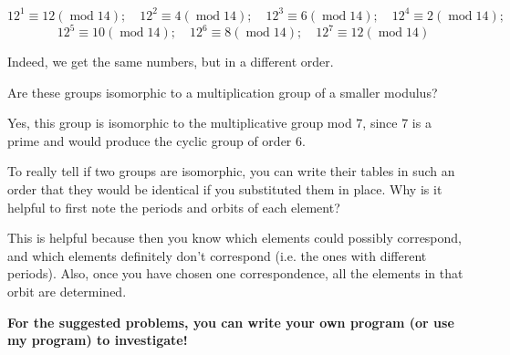 \documentclass[../gatm_answers.tex]{subfiles}
\begin{document}
$$12^1 \equiv 12 (\operatorname{mod} 14);\quad 12^2 \equiv 4 (\operatorname{mod} 14);\quad 12^3 \equiv 6 (\operatorname{mod} 14);\quad 12^4 \equiv 2 (\operatorname{mod} 14);$$
$$\quad 12^5 \equiv 10 (\operatorname{mod} 14);\quad 12^6 \equiv 8 (\operatorname{mod} 14);\quad 12^7 \equiv 12 (\operatorname{mod} 14)$$

Indeed, we get the same numbers, but in a different order.

\begin{inner_problem}
\item Are these groups isomorphic to a multiplication group of a smaller modulus?
\end{inner_problem}

Yes, this group is isomorphic to the multiplicative group mod $7$, since $7$ is a prime and would produce the cyclic group of order $6$.

\begin{outer_problem}
\item To really tell if two groups are isomorphic, you can write their tables in such an order that they would be identical if you substituted them in place. Why is it helpful to first note the periods and orbits of each element?
\end{outer_problem}

This is helpful because then you know which elements could possibly correspond, and which elements definitely don't correspond (i.e. the ones with different periods). Also, once you have chosen one correspondence, all the elements in that orbit are determined.

\textbf{For the suggested problems, you can write your own program (or use my program) to investigate!}
\end{document}
